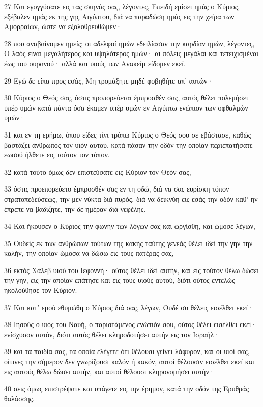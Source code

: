 \par 27 Και εγογγύσατε εις τας σκηνάς σας, λέγοντες, Επειδή εμίσει ημάς ο Κύριος, εξέβαλεν ημάς εκ της γης Αιγύπτου, διά να παραδώση ημάς εις την χείρα των Αμορραίων, ώστε να εξολοθρευθώμεν·
\par 28 που αναβαίνομεν ημείς; οι αδελφοί ημών εδειλίασαν την καρδίαν ημών, λέγοντες, Ο λαός είναι μεγαλήτερος και υψηλότερος ημών· αι πόλεις μεγάλαι και τετειχισμέναι έως του ουρανού· αλλά και υιούς των Ανακείμ είδομεν εκεί.
\par 29 Εγώ δε είπα προς εσάς, Μη τρομάξητε μηδέ φοβηθήτε απ' αυτών·
\par 30 Κύριος ο Θεός σας, όστις προπορεύεται έμπροσθέν σας, αυτός θέλει πολεμήσει υπέρ υμών κατά πάντα όσα έκαμεν υπέρ υμών εν Αιγύπτω ενώπιον των οφθαλμών υμών·
\par 31 και εν τη ερήμω, όπου είδες τίνι τρόπω Κύριος ο Θεός σου σε εβάστασε, καθώς βαστάζει άνθρωπος τον υιόν αυτού, κατά πάσαν την οδόν την οποίαν περιεπατήσατε εωσού ήλθετε εις τούτον τον τόπον.
\par 32 κατά τούτο όμως δεν επιστεύσατε εις Κύριον τον Θεόν σας,
\par 33 όστις προεπορεύετο έμπροσθέν σας εν τη οδώ, διά να σας ευρίσκη τόπον στρατοπεδεύσεως, την μεν νύκτα διά πυρός, διά να δεικνύη εις εσάς την οδόν καθ' ην έπρεπε να βαδίζητε, την δε ημέραν διά νεφέλης.
\par 34 Και ήκουσεν ο Κύριος την φωνήν των λόγων σας και ωργίσθη, και ώμοσε λέγων,
\par 35 Ουδείς εκ των ανθρώπων τούτων της κακής ταύτης γενεάς θέλει ιδεί την γην την καλήν, την οποίαν ώμοσα να δώσω εις τους πατέρας σας,
\par 36 εκτός Χάλεβ υιού του Ιεφοννή· ούτος θέλει ιδεί αυτήν, και εις τούτον θέλω δώσει την γην, εις την οποίαν επάτησε και εις τους υιούς αυτού, διότι ούτος εντελώς ηκολούθησε τον Κύριον.
\par 37 Και κατ' εμού εθυμώθη ο Κύριος διά σας, λέγων, Ουδέ συ θέλεις εισέλθει εκεί·
\par 38 Ιησούς ο υιός του Ναυή, ο παριστάμενος ενώπιόν σου, ούτος θέλει εισέλθει εκεί· ενίσχυσον αυτόν, διότι αυτός θέλει κληροδοτήσει αυτήν εις τον Ισραήλ·
\par 39 και τα παιδία σας, τα οποία ελέγετε ότι θέλουσι γείνει λάφυρον, και οι υιοί σας, οίτινες την σήμερον δεν γνωρίζουσι καλόν ή κακόν, αυτοί θέλουσιν εισέλθει εκεί και εις αυτούς θέλω δώσει αυτήν, και αυτοί θέλουσι κληρονομήσει αυτήν·
\par 40 σεις όμως επιστρέψατε και υπάγετε εις την έρημον, κατά την οδόν της Ερυθράς θαλάσσης.
